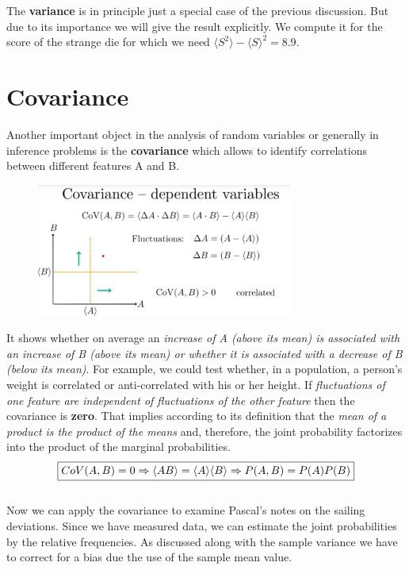\documentclass[12pt, a4paper]{scrartcl}
\begin{document}
The  \textbf{variance} is in principle just a special case of the previous discussion. But due to its importance we will give the result explicitly. We compute it for the score of the strange die for which we need $\langle S^2\rangle - \langle S\rangle ^2=8.9$.\\ 

\section*{Covariance}
Another important object in the analysis of random variables or generally in inference problems is the  \textbf{covariance} which allows to identify correlations between different features A and B. 
\begin{figure}[H]
	\centering
	\includegraphics[width=0.75\textwidth]{3_11.png}
\end{figure}
It shows whether on average an \textit{increase of A (above its mean) is associated with an increase of B (above its mean) or whether it is associated with a decrease of B (below its mean)}. 
For example, we could test whether, in a population, a person's weight is correlated or anti-correlated with his or her height.
If \textit{fluctuations of one feature are independent of fluctuations of the other feature} then the covariance is  \textbf{zero}. 
That implies according to its definition that the \textit{mean of a product is the product of the means} and, therefore, the joint probability factorizes into the product of the marginal probabilities.
\begin{equation*}\boxed{CoV(A,B)=0 \Rightarrow \langle AB\rangle = \langle A\rangle\langle B\rangle \\
\Rightarrow P(A,B) = P(A)P(B)}\end{equation*}\\
Now we can apply the covariance to examine Pascal's notes on the sailing deviations. Since we have measured data, we can estimate the joint probabilities by the relative frequencies. As discussed along with the sample variance we have to correct for a bias due the use of the sample mean value.%
\end{document}
